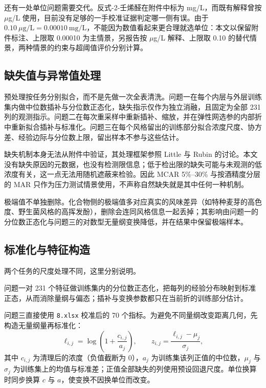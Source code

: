 \documentclass[UTF8,a4paper,zihao=-4]{ctexart}
\numberwithin{figure}{section}
\numberwithin{table}{section}
\numberwithin{equation}{section}
\newcommand{\file}[1]{\texttt{#1}}
\begin{document}
还有一处单位问题需要交代。反式-2-壬烯醛在附件中标为 mg/L，而既有解释曾按 $\mu$g/L 使用，目前没有足够的一手校准证据判定哪一侧有误。由于 $0.10\ \mu\mathrm{g/L}=0.00010\ \mathrm{mg/L}$，不能因为数值看起来更合理就选单位：本文以保留附件标注、上限取 0.00010 为主情景，另报告按 $\mu$g/L 解释、上限取 0.10 的替代情景，两种情景的约束与超阈值评价分别计算。

\subsection{缺失值与异常值处理}

预处理按任务分别拟合，而不是先做一次全表清洗。问题一在每个内层与外层训练集内做中位数插补与分位数正态化，缺失指示仅作为独立消融，且固定为全部 231 列的观测指示。问题二在每次重采样中重新插补、缩放，并在弹性网选参的内部折中重新拟合插补与标准化。问题三在每个风格留出的训练部分拟合浓度尺度、协方差、经验边际与分位数上限，留出样本不参与这些估计。

缺失机制本身无法从附件中验证，其处理框架参照 Little 与 Rubin 的讨论\cite{little2019}。本文没有缺失原因的元数据，也没有检测限信息；低于检出限的缺失可能与未观测的低浓度有关，这一点无法用随机遮蔽来检验。因此 MCAR 5\%--30\% 与按酒精度分层的 MAR 只作为压力测试情景使用，不声称自然缺失就是其中任何一种机制。

极端值不单独删除。化合物侧的极端值多对应真实的风味差异（如特种麦芽的高色度、野生菌风格的高挥发酚），删除会连同风格信息一起丢掉；其影响由问题一的分位数正态化与问题三的对数型无量纲变换降低，并在结果中保留极端样本。

\subsection{标准化与特征构造}

两个任务的尺度处理不同，这里分别说明。

问题一对 231 个特征做训练集内的分位数正态化，把每列的经验分布映射到标准正态，从而消除量纲与偏态；插补与变换参数都只在当前折的训练部分估计。

问题三直接使用 \file{8.xlsx} 校准后的 70 个指标。为避免不同量纲改变距离几何，先构造无量纲量再标准化：
\begin{equation}
\ell_{i,j}=\log\left(1+\frac{c_{i,j}}{a_{j}}\right),\qquad
z_{i,j}=\frac{\ell_{i,j}-\mu_{j}}{\sigma_{j}},
\label{eq:q3scale}
\end{equation}
其中 $c_{i,j}$ 为清理后的浓度（负值截断为 0），$a_j$ 为训练集该列正值的中位数，$\mu_j$ 与 $\sigma_j$ 为训练集上的均值与标准差；正值全部缺失的列使用预设回退尺度。单位换算时同步换算 $c$ 与 $a$，使变换不因换单位而改变。
\end{document}
